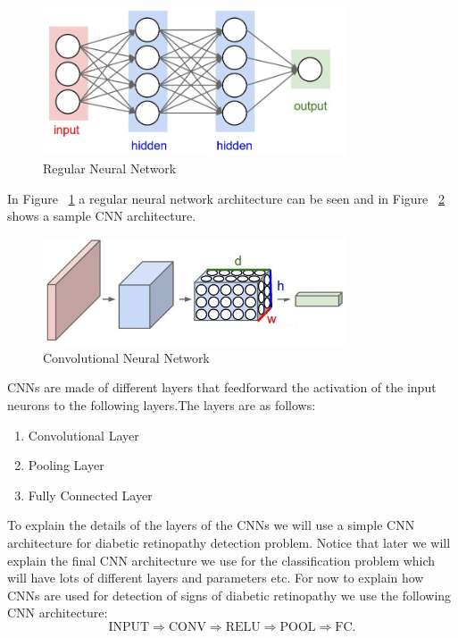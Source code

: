 \begin{figure}[t]
\caption{Regular Neural Network}
\label{figregnn}
\centering
\includegraphics[width=0.8\textwidth]{Figures/regnn}
\end{figure}

In Figure ~\ref{figregnn} a regular neural network architecture can be seen and in Figure ~\ref{figconvnet} shows a sample CNN architecture. 

\begin{figure}[t]
\caption{Convolutional Neural Network}
\label{figconvnet}
\centering
\includegraphics[width=0.8\textwidth]{Figures/convnet}
\end{figure}

CNNs are made of different layers that feedforward the activation of the input neurons to the following layers.The layers are as follows:

\begin{enumerate}
    \item Convolutional Layer
    \item Pooling Layer
    \item Fully Connected Layer
\end{enumerate}

To explain the details of the layers of the CNNs we will use a simple CNN architecture for diabetic retinopathy detection problem. Notice that later we will explain the final CNN architecture we use for the classification problem which will have lots of different layers and parameters etc. For now to explain how CNNs are used for detection of signs of diabetic retinopathy we use the following CNN architecture:
\[
\text{INPUT} \Rightarrow \text{CONV} \Rightarrow \text{RELU} \Rightarrow \text{POOL} \Rightarrow \text{FC}.
\]

